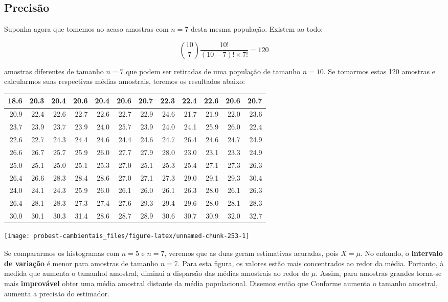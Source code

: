 \documentclass[
]{book}
\begin{document}
\hypertarget{precisuxe3o}{%
\subsection{Precisão}\label{precisuxe3o}}

Suponha agora que tomemos ao acaso amostras com \(n = 7\) desta mesma população. Existem ao todo:

\[{{10}\choose{7}} \frac{10!}{(10-7)! \times 7!} = 120\]

amostras diferentes de tamanho \(n = 7\) que podem ser retiradas de uma população de tamanho \(n = 10\). Se tomarmos estas 120 amostras e calcularmos suas respectivas médias amostrais, teremos os resultados abaixo:

\begin{tabular}{r|r|r|r|r|r|r|r|r|r|r|r}
\hline
18.6 & 20.3 & 20.4 & 20.6 & 20.4 & 20.6 & 20.7 & 22.3 & 22.4 & 22.6 & 20.6 & 20.7\\
\hline
20.9 & 22.4 & 22.6 & 22.7 & 22.6 & 22.7 & 22.9 & 24.6 & 21.7 & 21.9 & 22.0 & 23.6\\
\hline
23.7 & 23.9 & 23.7 & 23.9 & 24.0 & 25.7 & 23.9 & 24.0 & 24.1 & 25.9 & 26.0 & 22.4\\
\hline
22.6 & 22.7 & 24.3 & 24.4 & 24.6 & 24.4 & 24.6 & 24.7 & 26.4 & 24.6 & 24.7 & 24.9\\
\hline
26.6 & 26.7 & 25.7 & 25.9 & 26.0 & 27.7 & 27.9 & 28.0 & 23.0 & 23.1 & 23.3 & 24.9\\
\hline
25.0 & 25.1 & 25.0 & 25.1 & 25.3 & 27.0 & 25.1 & 25.3 & 25.4 & 27.1 & 27.3 & 26.3\\
\hline
26.4 & 26.6 & 28.3 & 28.4 & 28.6 & 27.0 & 27.1 & 27.3 & 29.0 & 29.1 & 29.3 & 30.4\\
\hline
24.0 & 24.1 & 24.3 & 25.9 & 26.0 & 26.1 & 26.0 & 26.1 & 26.3 & 28.0 & 26.1 & 26.3\\
\hline
26.4 & 28.1 & 28.3 & 27.3 & 27.4 & 27.6 & 29.3 & 29.4 & 29.6 & 28.0 & 28.1 & 28.3\\
\hline
30.0 & 30.1 & 30.3 & 31.4 & 28.6 & 28.7 & 28.9 & 30.6 & 30.7 & 30.9 & 32.0 & 32.7\\
\hline
\end{tabular}

\begin{center}\texttt{[image: probest-cambientais\_files/figure-latex/unnamed-chunk-253-1]} \end{center}

Se compararmos os histogramas com \(n = 5\) e \(n = 7\), veremos que as duas geram estimativas acuradas, pois \(\overline{\overline{X}} = \mu\). No entando, o \textbf{intervalo de variação} é menor para amostras de tamanho \(n = 7\). Para esta figura, os valores estão mais concentrados ao redor da média. Portanto, à medida que aumenta o tamanhol amostral, diminui a disparsão das médias amostrais ao redor de \(\mu\). Assim, para amostras grandes torna-se mais \textbf{improvável} obter uma média amostral distante da média populacional. Disemoz então que Conforme aumenta o tamanho amostral, aumenta a precisão do estimador.
\end{document}
